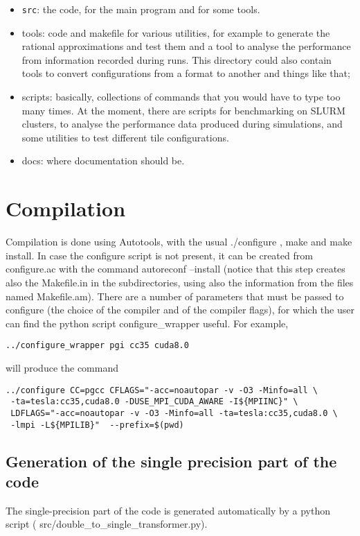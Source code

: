 \begin{itemize}
    \item \texttt{src}: the code, for the main program and for some tools.
    \item tools: code and makefile for various utilities, for example to generate the rational approximations and test them and a tool to analyse the performance from information recorded during runs. This directory could also contain tools to convert configurations from a format to another and things like that; 
    \item scripts: basically, collections of commands that you would have to type too many times. 
    At the moment, there are scripts for benchmarking on SLURM clusters, to analyse the performance data produced during simulations,
    and some utilities to test different \textsf{ tile} configurations.
    \item docs: where documentation should be.
\end{itemize}
\section{Compilation}
\label{compilation}
Compilation is done using Autotools, with the usual \textsf{ ./configure} , \textsf{ make} and \textsf{ make install}.
In case the \textsf{ configure} script is not present, it can be created from \textsf{ configure.ac} 
with the command \textsf{autoreconf --install} (notice that this step creates also the \textsf{ Makefile.in} in the subdirectories, 
using also the information from the files named \textsf{ Makefile.am}). 
There are a number of parameters that must be passed to \textsf{ configure} (the choice of the compiler and of the compiler flags), for which the user can find the python script \textsf{ configure\_wrapper} useful. For example,
\begin{verbatim}
../configure_wrapper pgi cc35 cuda8.0
\end{verbatim}
will produce the command
\begin{verbatim}
../configure CC=pgcc CFLAGS="-acc=noautopar -v -O3 -Minfo=all \
 -ta=tesla:cc35,cuda8.0 -DUSE_MPI_CUDA_AWARE -I${MPIINC}" \
 LDFLAGS="-acc=noautopar -v -O3 -Minfo=all -ta=tesla:cc35,cuda8.0 \
 -lmpi -L${MPILIB}"  --prefix=$(pwd)
\end{verbatim}

\subsection{Generation of the single precision part of the code}
The single-precision part of the code is generated automatically 
by a python script (\textsf{ src/double\_to\_single\_transformer.py}).

